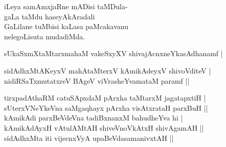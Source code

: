 \begin{entry}
\gl{}
\begin{shl}
iLeya samAmxjaRne mADisi taMDula-\\
gaLa taMdu haseyAkAradali\\
GaLilane tuMbisi kaLasa paMcakavanu\\
nelegoLisuta mudadiMda.
\end{shl}
\end{entry}

\begin{entry}
\begin{shl}
sUkaSxmXtaMtarxmahaM vakeSxyXV shivajAcnxneYkasAdhanamf |
\end{shl}
\begin{shl}
sidAdhxMtAKeyxV mahAtaMterxV kAmikAdeyxV shivoVditeV |\\
nidiRSaTxmutatxreV BAgeV viVrasheYvamataM paramf ||
\end{shl}
\begin{shl}
tirxpadAthaRM catuSApxdaM pArxha taMtarxM jagatapxtiH |\\
sUterxVNeYkeVna saMgaqhayx pArxha visAtxrataH parxBuH ||\\
kAmikAdi parxBeVdeVna tadiBxnanxM bahudheYva hi |\\
kAmikAdAyxH vAtulAMtAH shiveVnoVkAtxH shivAgamAH ||\\
sidAdhxMta iti vijecnxVyA upaBeVdasamanivxtAH ||
\end{shl}
\end{entry}

